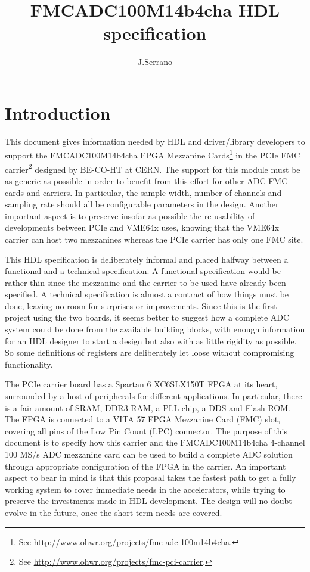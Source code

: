 \documentclass{article}
\title{FMCADC100M14b4cha HDL specification}
\author{J.Serrano}
\begin{document}
\maketitle


\section{Introduction}
This document gives information needed by HDL and driver/library developers to support the FMCADC100M14b4cha FPGA Mezzanine Cards\footnote{See \href{http://www.ohwr.org/projects/fmc-adc-100m14b4cha}{http://www.ohwr.org/projects/fmc-adc-100m14b4cha}.} in the PCIe FMC carrier\footnote{See \href{http://www.ohwr.org/projects/fmc-pci-carrier}{http://www.ohwr.org/projects/fmc-pci-carrier}.} designed by BE-CO-HT at CERN. The support for this module must be as generic as possible in order to benefit from this effort for other ADC FMC cards and carriers. In particular, the sample width, number of channels and sampling rate should all be configurable parameters in the design. Another important aspect is to preserve insofar as possible the re-usability of developments between PCIe and VME64x uses, knowing that the VME64x carrier can host two mezzanines whereas the PCIe carrier has only one FMC site.

This HDL specification is deliberately informal and placed halfway between a functional and a technical specification. A functional specification would be rather thin since the mezzanine and the carrier to be used have already been specified. A technical specification is almost a contract of how things must be done, leaving no room for surprises or improvements. Since this is the first project using the two boards, it seems better to suggest how a complete ADC system could be done from the available building blocks, with enough information for an HDL designer to start a design but also with as little rigidity as possible. So some definitions of registers are deliberately let loose without compromising functionality.

The PCIe carrier board has a Spartan 6 XC6SLX150T FPGA at its heart, surrounded by a host of peripherals for different applications. In particular, there is a fair amount of SRAM, DDR3 RAM, a PLL chip, a DDS and Flash ROM. The FPGA is connected to a VITA 57 FPGA Mezzanine Card (FMC) slot, covering all pins of the Low Pin Count (LPC) connector. The purpose of this document is to specify how this carrier and the FMCADC100M14b4cha 4-channel 100 MS/s ADC mezzanine card can be used to build a complete ADC solution through appropriate configuration of the FPGA in the carrier. An important aspect to bear in mind is that this proposal takes the fastest path to get a fully working system to cover immediate needs in the accelerators, while trying to preserve the investments made in HDL development. The design will no doubt evolve in the future, once the short term needs are covered.
\end{document}
